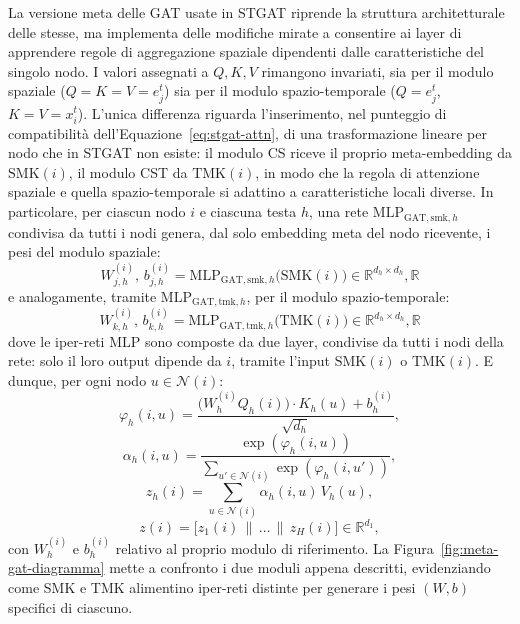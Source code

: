 La versione meta delle GAT usate in STGAT riprende la struttura architetturale delle stesse,
ma implementa delle modifiche mirate a consentire ai layer di apprendere regole di aggregazione spaziale
dipendenti dalle caratteristiche del singolo nodo.
I valori assegnati a $Q, K, V$ rimangono invariati, sia per il modulo spaziale
($Q=K=V=e_j^t$) sia per il modulo spazio-temporale ($Q=e_j^t$, $K=V=x_i^t$).
L'unica differenza riguarda l'inserimento, nel punteggio di compatibilità dell'Equazione~\ref{eq:stgat-attn},
di una trasformazione lineare per nodo che in STGAT non esiste: il modulo CS
riceve il proprio meta-embedding da $\mathrm{SMK}(i)$, il modulo CST da
$\mathrm{TMK}(i)$, in modo che la regola di attenzione spaziale e quella
spazio-temporale si adattino a caratteristiche locali diverse.
In particolare, per ciascun nodo $i$ e ciascuna testa $h$, una rete
$\mathrm{MLP}_{\mathrm{GAT,smk},h}$ condivisa da tutti i nodi genera, dal
solo embedding meta del nodo ricevente, i pesi del modulo spaziale:
\begin{equation}
  W_{j,h}^{(i)}, \, b_{j,h}^{(i)} = \mathrm{MLP}_{\mathrm{GAT,smk},h}\big( \mathrm{SMK}(i) \big) \in \mathbb{R}^{d_h \times d_h}, \mathbb{R}
  \label{eq:metagat-hyper-smk}
\end{equation}
e analogamente, tramite $\mathrm{MLP}_{\mathrm{GAT,tmk},h}$, per il modulo spazio-temporale:
\begin{equation}
  W_{k,h}^{(i)}, \, b_{k,h}^{(i)} = \mathrm{MLP}_{\mathrm{GAT,tmk},h}\big( \mathrm{TMK}(i) \big) \in \mathbb{R}^{d_h \times d_h}, \mathbb{R}
  \label{eq:metagat-hyper-tmk}
\end{equation}
dove le iper-reti $\mathrm{MLP}$ sono composte da due layer, condivise da
tutti i nodi della rete: solo il loro output dipende da $i$, tramite
l'input $\mathrm{SMK}(i)$ o $\mathrm{TMK}(i)$.
E dunque, per ogni nodo $u \in \mathcal{N}(i)$:
\begin{equation}
  \varphi_h(i,u) = \frac{\big(W_h^{(i)} Q_h(i)\big) \cdot K_h(u) + b_h^{(i)}}{\sqrt{d_h}} ,
  \label{eq:metagat-attn}
\end{equation}
\[ \alpha_h(i,u) = \frac{\exp(\varphi_h(i,u))}{\sum_{u' \in \mathcal{N}(i)} \exp(\varphi_h(i,u'))} ,\]
\[ z_h(i) = \sum_{u \in \mathcal{N}(i)} \alpha_h(i,u)\, V_h(u) ,\]
\[ z(i) = \big[z_1(i) \,\|\, \dots \,\|\, z_H(i)\big] \in \mathbb{R}^{d_1} ,\]
con $W_h^{(i)}$ e $b_h^{(i)}$ relativo al proprio modulo di riferimento.
La Figura~\ref{fig:meta-gat-diagramma} mette a confronto i due moduli appena
descritti, evidenziando come SMK e TMK alimentino iper-reti distinte per
generare i pesi $(W,b)$ specifici di ciascuno.

